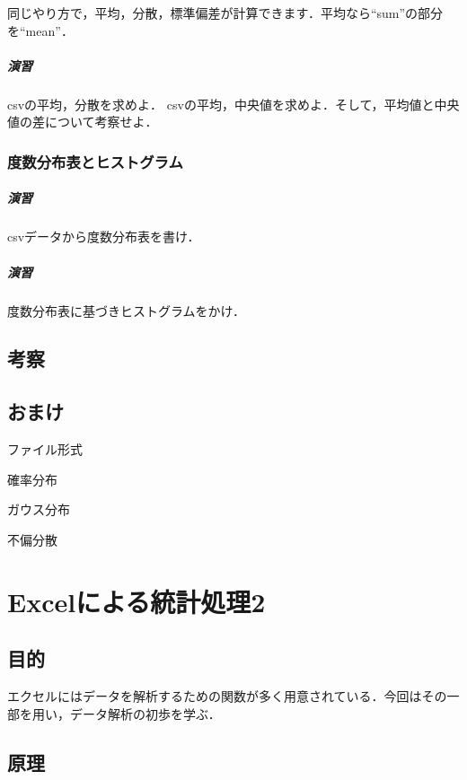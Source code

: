 \documentclass[12pt, a4j]{jreport}
\begin{document}
同じやり方で，平均，分散，標準偏差が計算できます．平均なら``sum''の部分を``mean''．

\paragraph{演習}

csvの平均，分散を求めよ．
csvの平均，中央値を求めよ．そして，平均値と中央値の差について考察せよ．



\subsection{度数分布表とヒストグラム}

\paragraph{演習}
csvデータから度数分布表を書け．

\paragraph{演習}
度数分布表に基づきヒストグラムをかけ．



\section{考察}



\section{おまけ}

ファイル形式

確率分布

ガウス分布

不偏分散

\chapter{Excelによる統計処理2}

\section{目的}

エクセルにはデータを解析するための関数が多く用意されている．今回はその一部を用い，データ解析の初歩を学ぶ．

\section{原理}
\end{document}
